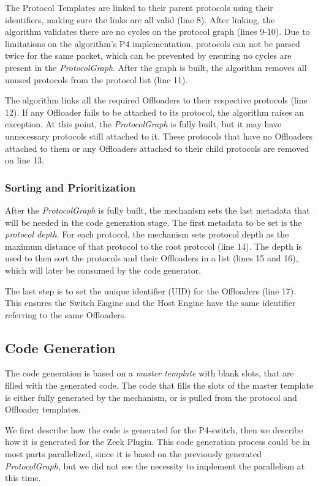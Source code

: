 The Protocol Templates are linked to their parent protocols using their identifiers, making sure the links are all valid (line 8). After linking, the algorithm validates there are no cycles on the protocol graph (lines 9-10). Due to limitations on the algorithm's P4 implementation, protocols can not be parsed twice for the same packet, which can be prevented by ensuring no cycles are present in the \textit{ProtocolGraph}. After the graph is built, the algorithm removes all unused protocols from the protocol list (line 11).

The algorithm links all the required Offloaders to their respective protocols (line 12). If any Offloader fails to be attached to its protocol, the algorithm raises an exception. At this point, the \textit{ProtocolGraph} is fully built, but it may have unnecessary protocols still attached to it. These protocols that have no Offloaders attached to them or any Offloaders attached to their child protocols are removed on line 13.

\subsubsection*{Sorting and Prioritization}

After the \textit{ProtocolGraph} is fully built, the mechanism sets the last metadata that will be needed in the code generation stage. The first metadata to be set is the \textit{protocol depth}. For each protocol, the mechanism sets protocol depth as the maximum distance of that protocol to the root protocol (line 14). The depth is used to then sort the protocols and their Offloaders in a list (lines 15 and 16), which will later be consumed by the code generator.

The last step is to set the unique identifier (UID) for the Offloaders (line 17). This ensures the Switch Engine and the Host Engine have the same identifier referring to the same Offloaders.

\subsection{Code Generation}

The code generation is based on a \textit{master template} with blank slots, that are filled with the generated code. The code that fills the slots of the master template is either fully generated by the mechanism, or is pulled from the protocol and Offloader templates.

We first describe how the code is generated for the P4-switch, then we describe how it is generated for the Zeek Plugin. This code generation process could be in most parts parallelized, since it is based on the previously generated \textit{ProtocolGraph}, but we did not see the necessity to implement the parallelism at this time.

